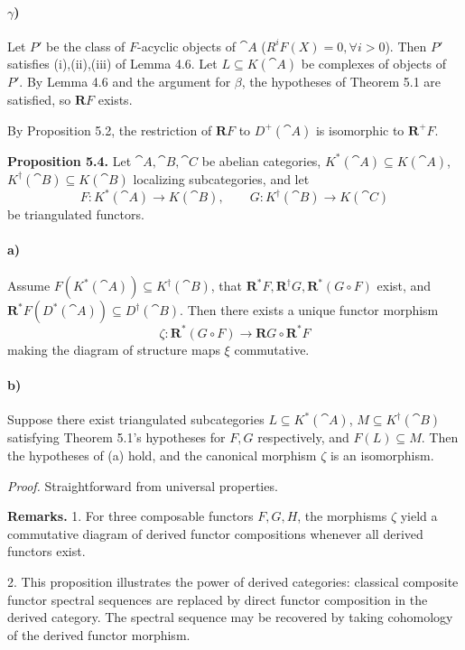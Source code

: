 \paragraph{$\gamma$)}
Let \(P'\) be the class of \(F\)-acyclic objects of \(\cat{A}\) (\(R^iF(X)=0,\forall i>0\)). Then \(P'\) satisfies (i),(ii),(iii) of Lemma 4.6. Let \(L\subseteq K(\cat{A})\) be complexes of objects of \(P'\). By Lemma 4.6 and the argument for \(\beta\), the hypotheses of Theorem 5.1 are satisfied, so \(\mathbf{R}F\) exists.

\setcounter{page}{59}
By Proposition 5.2, the restriction of \(\mathbf{R}F\) to \(D^+(\cat{A})\) is isomorphic to \(\mathbf{R}^+F\).

\medskip
\textbf{Proposition 5.4.}
Let \(\cat{A},\cat{B},\cat{C}\) be abelian categories, \(K^*(\cat{A})\subseteq K(\cat{A})\), \(K^\dagger(\cat{B})\subseteq K(\cat{B})\) localizing subcategories, and let
\[
F\colon K^*(\cat{A})\to K(\cat{B}),\qquad
G\colon K^\dagger(\cat{B})\to K(\cat{C})
\]
be triangulated functors.

\paragraph{a)}
Assume \(F(K^*(\cat{A}))\subseteq K^\dagger(\cat{B})\), that \(\mathbf{R}^*F,\mathbf{R}^\dagger G,\mathbf{R}^*(G\circ F)\) exist, and \(\mathbf{R}^*F(D^*(\cat{A}))\subseteq D^\dagger(\cat{B})\). Then there exists a unique functor morphism
\[
\zeta\colon \mathbf{R}^*(G\circ F) \to \mathbf{R}G\circ \mathbf{R}^*F
\]
making the diagram of structure maps \(\xi\) commutative.

\setcounter{page}{60}
\paragraph{b)}
Suppose there exist triangulated subcategories \(L\subseteq K^*(\cat{A})\), \(M\subseteq K^\dagger(\cat{B})\) satisfying Theorem 5.1's hypotheses for \(F,G\) respectively, and \(F(L)\subseteq M\). Then the hypotheses of (a) hold, and the canonical morphism \(\zeta\) is an isomorphism.

\textit{Proof.} Straightforward from universal properties.

\medskip
\textbf{Remarks.}
1. For three composable functors \(F,G,H\), the morphisms \(\zeta\) yield a commutative diagram of derived functor compositions whenever all derived functors exist.

2. This proposition illustrates the power of derived categories: classical composite functor spectral sequences are replaced by direct functor composition in the derived category. The spectral sequence may be recovered by taking cohomology of the derived functor morphism.

